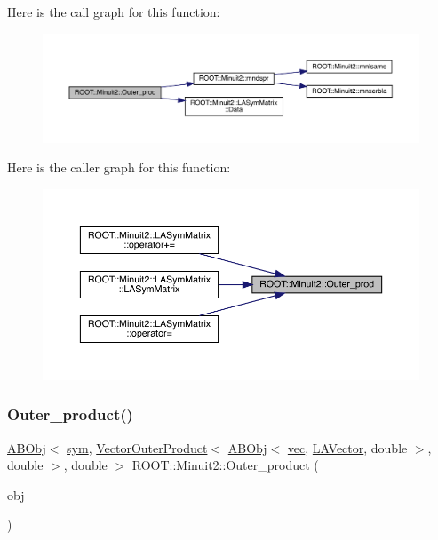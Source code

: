 Here is the call graph for this function\+:
\nopagebreak
\begin{figure}[H]
\begin{center}
\leavevmode
\includegraphics[width=350pt]{d6/d3a/namespaceROOT_1_1Minuit2_ac07a37ec0cf04b47c95ddc6943487ef2_cgraph}
\end{center}
\end{figure}
Here is the caller graph for this function\+:
\nopagebreak
\begin{figure}[H]
\begin{center}
\leavevmode
\includegraphics[width=350pt]{d6/d3a/namespaceROOT_1_1Minuit2_ac07a37ec0cf04b47c95ddc6943487ef2_icgraph}
\end{center}
\end{figure}
\mbox{\label{namespaceROOT_1_1Minuit2_a2f3a76ab9b1a9a2ed58cfdc8de6ff704}} 
\subsubsection{\texorpdfstring{Outer\_product()}{Outer\_product()}\hspace{0.1cm}{\footnotesize\ttfamily [1/2]}}
{\footnotesize\ttfamily \mbox{\hyperlink{classROOT_1_1Minuit2_1_1ABObj}{A\+B\+Obj}}$<$ \mbox{\hyperlink{classROOT_1_1Minuit2_1_1sym}{sym}}, \mbox{\hyperlink{classROOT_1_1Minuit2_1_1VectorOuterProduct}{Vector\+Outer\+Product}}$<$ \mbox{\hyperlink{classROOT_1_1Minuit2_1_1ABObj}{A\+B\+Obj}}$<$ \mbox{\hyperlink{classROOT_1_1Minuit2_1_1vec}{vec}}, \mbox{\hyperlink{classROOT_1_1Minuit2_1_1LAVector}{L\+A\+Vector}}, double $>$, double $>$, double $>$ R\+O\+O\+T\+::\+Minuit2\+::\+Outer\+\_\+product (\begin{DoxyParamCaption}\item[{const \mbox{\hyperlink{classROOT_1_1Minuit2_1_1ABObj}{A\+B\+Obj}}$<$ \mbox{\hyperlink{classROOT_1_1Minuit2_1_1vec}{vec}}, \mbox{\hyperlink{classROOT_1_1Minuit2_1_1LAVector}{L\+A\+Vector}}, double $>$ \&}]{obj }\end{DoxyParamCaption})\hspace{0.3cm}{\ttfamily [inline]}}

